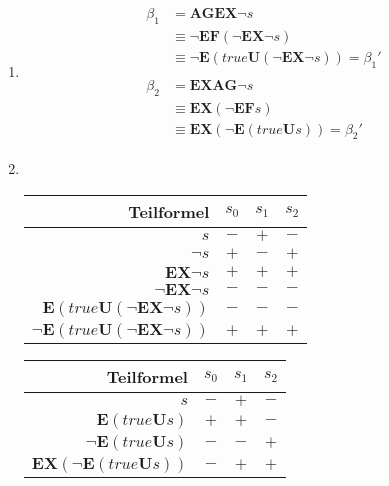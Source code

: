 \documentclass[a4paper]{scrartcl}
\begin{document}
\begin{enumerate}
    \item
        \begin{align}
            \begin{split}
                \beta_1 &= \textbf{AGEX} \lnot s \\
                &\equiv \lnot \textbf{EF} (\lnot \textbf{EX} \lnot s) \\
                &\equiv \lnot \textbf{E} (true \textbf{U} (\lnot \textbf{EX} \lnot s)) = \beta_1'
            \end{split} \\
            \begin{split}
                \beta_2 &= \textbf{EXAG} \lnot s \\
                &\equiv \textbf{EX} (\lnot \textbf{EF} s) \\
                &\equiv \textbf{EX} (\lnot \textbf{E} (true \textbf{U} s)) = \beta_2'
            \end{split}
        \end{align}
        

    \item \hfill \\
        \begin{table}[h]
            \begin{subtable}{0.5\textwidth}
                \begin{tabular}{r|ccc}
                    Teilformel & $s_0$ & $s_1$ & $s_2$ \\ \hline
                    $s$ & $-$ & $+$ & $-$ \\
                    $\lnot s$ & $+$ & $-$ & $+$ \\
                    $\textbf{EX} \lnot s$ & $+$ & $+$ & $+$ \\
                    $\lnot \textbf{EX} \lnot s$ & $-$ & $-$ & $-$ \\
                    $\textbf{E} (true \textbf{U} (\lnot \textbf{EX} \lnot s))$ & $-$ & $-$ & $-$ \\
                    $\lnot \textbf{E} (true \textbf{U} (\lnot \textbf{EX} \lnot s))$ & $+$ & $+$ & $+$ \\
                \end{tabular}
            \end{subtable}
            \begin{subtable}{0.5\textwidth}
                \begin{tabular}{r|ccc}
                    Teilformel & $s_0$ & $s_1$ & $s_2$ \\ \hline
                    $s$ & $-$ & $+$ & $-$ \\
                    $\textbf{E} (true \textbf{U} s)$ & $+$ & $+$ & $-$ \\
                    $\lnot \textbf{E} (true \textbf{U} s)$ & $-$ & $-$ & $+$ \\
                    $\textbf{EX}(\lnot \textbf{E} (true \textbf{U} s))$ & $-$ & $+$ & $+$ \\
                \end{tabular}
            \end{subtable}
        \end{table}


\end{enumerate}
\end{document}
